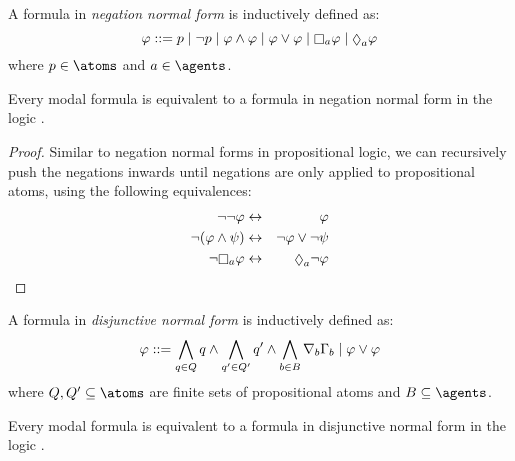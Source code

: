 \begin{definition}
A formula in {\em negation normal form} is inductively defined as:
$$
\phi ::= \atomP \mid
         \lnot \atomP \mid
         \phi \land \phi \mid
         \phi \lor \phi \mid
         \necessaryA \phi \mid
         \possibleA \phi
$$
where $\atomP \in \atoms$ and $\agentA \in \agents$.
\end{definition}

\begin{lemma}\label{nnf-equivalent}
Every modal formula is equivalent to a formula in negation normal form in the logic \logicK{}.
\end{lemma}

\begin{proof}
Similar to negation normal forms in propositional logic, we can recursively push the negations inwards until negations are only applied to propositional atoms, using the following equivalences:
\begin{eqnarray*}
    \lnot \lnot \phi &\iff& \phi\\
    \lnot (\phi \land \psi) &\iff& \lnot \phi \lor \lnot \psi\\
    \lnot \necessaryA \phi &\iff& \possibleA \lnot \phi
\end{eqnarray*}
\end{proof}

\begin{definition}
A formula in {\em disjunctive normal form} is inductively defined as:
$$
\varphi ::= \bigwedge_{q \in Q} q \land \bigwedge_{q' \in Q'} q' \land \bigwedge_{b \in B} \nabla_{b} \Gamma_b \mid \varphi \lor \varphi
$$
where $\atomsQ, \atomsQ' \subseteq \atoms$ are finite sets of propositional atoms and $\agentsB \subseteq \agents$.
\end{definition}

\begin{lemma}\label{dnf-equivalent}
Every modal formula is equivalent to a formula in disjunctive normal form in the logic \logicK{}.
\end{lemma}

